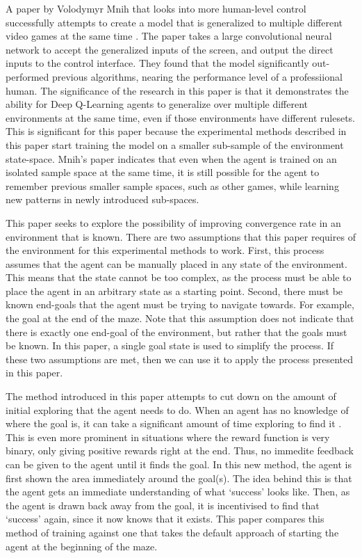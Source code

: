 \documentclass[12pt,letterpaper]{article}
\begin{document}
A paper by Volodymyr Mnih that looks into more human-level control successfully attempts to create a model that is generalized to multiple different video games at the same time \cite{article_human_level_control_deep_reinforcement_learning}.
The paper takes a large convolutional neural network to accept the generalized inputs of the screen, and output the direct inputs to the control interface.
They found that the model significantly out-performed previous algorithms, nearing the performance level of a professiional human.
The significance of the research in this paper is that it demonstrates the ability for Deep Q-Learning agents to generalize over multiple different environments at the same time, even if those environments have different rulesets.
This is significant for this paper because the experimental methods described in this paper start training the model on a smaller sub-sample of the environment state-space.
Mnih's paper indicates that even when the agent is trained on an isolated sample space at the same time, it is still possible for the agent to remember previous smaller sample spaces, such as other games, while learning new patterns in newly introduced sub-spaces.

This paper seeks to explore the possibility of improving convergence rate in an environment that is known.
There are two assumptions that this paper requires of the environment for this experimental methods to work.
First, this process assumes that the agent can be manually placed in any state of the environment.
This means that the state cannot be too complex, as the process must be able to place the agent in an arbitrary state as a starting point.
Second, there must be known end-goals that the agent must be trying to navigate towards.
For example, the goal at the end of the maze.
Note that this assumption does not indicate that there is exactly one end-goal of the environment, but rather that the goals must be known.
In this paper, a single goal state is used to simplify the process.
If these two assumptions are met, then we can use it to apply the process presented in this paper.

The method introduced in this paper attempts to cut down on the amount of initial exploring that the agent needs to do.
When an agent has no knowledge of where the goal is, it can take a significant amount of time exploring to find it \cite{article_kickstart_deep_reinforcement_learning}.
This is even more prominent in situations where the reward function is very binary, only giving positive rewards right at the end.
Thus, no immedite feedback can be given to the agent until it finds the goal.
In this new method, the agent is first shown the area immediately around the goal(s).
The idea behind this is that the agent gets an immediate understanding of what `success' looks like.
Then, as the agent is drawn back away from the goal, it is incentivised to find that `success' again, since it now knows that it exists.
This paper compares this method of training against one that takes the default approach of starting the agent at the beginning of the maze.
\end{document}
